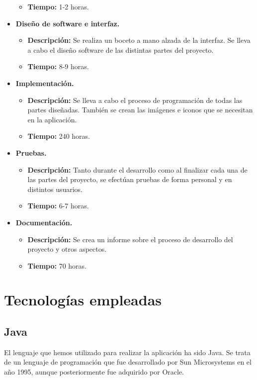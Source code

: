 \begin{itemize}
\begin{itemize}
            \item \textbf{Tiempo:} 1-2 horas. 
        \end{itemize}
    \item \textbf{Diseño de software e interfaz.}
        \begin{itemize}
            \item \textbf{Descripción:} Se realiza un boceto a mano alzada de la interfaz. Se lleva a cabo el diseño software de las distintas partes del proyecto.
            \item \textbf{Tiempo:} 8-9 horas. 
        \end{itemize}
    \item \textbf{Implementación.}
        \begin{itemize}
            \item \textbf{Descripción:} Se lleva a cabo el proceso de programación de todas las partes diseñadas. También se crean las imágenes e iconos que se necesitan en la aplicación.
            \item \textbf{Tiempo:} 240 horas.
        \end{itemize}
    \item \textbf{Pruebas.}
        \begin{itemize}
            \item \textbf{Descripción:} Tanto durante el desarrollo como al finalizar cada una de las partes del proyecto, se efectúan pruebas de forma personal y en distintos usuarios.  
            \item \textbf{Tiempo:} 6-7 horas.
        \end{itemize}
    \item \textbf{Documentación.}
        \begin{itemize}
            \item \textbf{Descripción:} Se crea un informe sobre el proceso de desarrollo del proyecto y otros aspectos.
            \item \textbf{Tiempo:} 70 horas.
        \end{itemize}
\end{itemize}

\newpage

\section{Tecnologías empleadas}

\subsection{Java}
El lenguaje que hemos utilizado para realizar la aplicación ha sido Java. Se trata de un lenguaje de programación que fue desarrollado por Sun Microsystems en el año 1995, aunque posteriormente fue adquirido por Oracle. 

